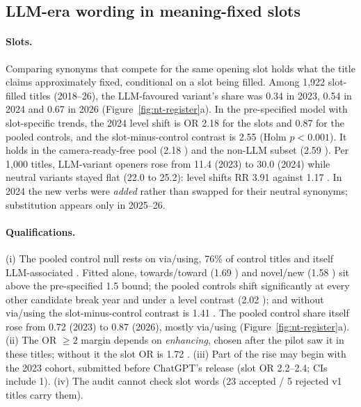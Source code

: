 \subsection{LLM-era wording in meaning-fixed slots}
\label{sec:nt-register}

\paragraph{Slots.}
Comparing synonyms that compete for the same opening slot holds what the title claims approximately fixed, conditional on a slot being filled. Among 1,922 slot-filled titles (2018--26), the LLM-favoured variant's share was 0.34 in 2023, 0.54 in 2024 and 0.67 in 2026 (Figure~\ref{fig:nt-register}a). In the pre-specified model with slot-specific trends, the 2024 level shift is OR 2.18  for the slots and 0.87  for the pooled controls, and the slot-minus-control contrast is 2.55  (Holm $p<0.001$). It holds in the camera-ready-free pool (2.18 ) and the non-LLM subset (2.59 ). Per 1,000 titles, LLM-variant openers rose from 11.4 (2023) to 30.0 (2024) while neutral variants stayed flat (22.0 to 25.2): level shifts RR 3.91  against 1.17 . In 2024 the new verbs were \emph{added} rather than swapped for their neutral synonyms; substitution appears only in 2025--26.

\paragraph{Qualifications.}
(i) The pooled control null rests on via/using, 76\% of control titles and itself LLM-associated \citep{geng2026beyond}. Fitted alone, towards/toward (1.69 ) and novel/new (1.58 ) sit above the pre-specified 1.5 bound; the pooled controls shift significantly at every other candidate break year and under a level contrast (2.02 ); and without via/using the slot-minus-control contrast is 1.41 . The pooled control share itself rose from 0.72 (2023) to 0.87 (2026), mostly via/using (Figure~\ref{fig:nt-register}a). (ii) The OR $\geq 2$ margin depends on \emph{enhancing}, chosen after the pilot saw it in these titles; without it the slot OR is 1.72 . (iii) Part of the rise may begin with the 2023 cohort, submitted before ChatGPT's release (slot OR 2.2--2.4; CIs include 1). (iv) The audit cannot check slot words (23 accepted / 5 rejected v1 titles carry them).

